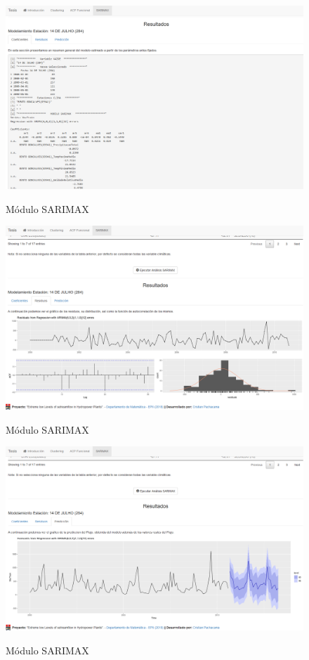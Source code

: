 \documentclass[12pt,oneside]{book}\usepackage[]{graphicx}\usepackage[]{color}
\theoremstyle{definition} %
\begin{document}
\begin{figure}[h]
\caption{Módulo SARIMAX}
\includegraphics[width=15cm]{Cap3-WebApp/modulo_sarimax4}
\label{fig:modulo_sarimax4}
\centering
\end{figure}

\begin{figure}[h]
\caption{Módulo SARIMAX}
\includegraphics[width=15cm]{Cap3-WebApp/modulo_sarimax5}
\label{fig:modulo_sarimax5}
\centering
\end{figure}

\begin{figure}[h]
\caption{Módulo SARIMAX}
\includegraphics[width=15cm]{Cap3-WebApp/modulo_sarimax6}
\label{fig:modulo_sarimax6}
\centering
\end{figure}
\end{document}
